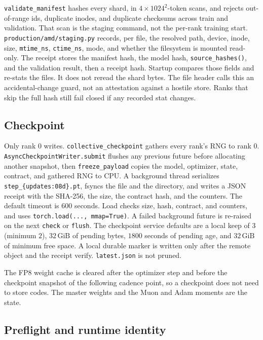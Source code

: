 \documentclass[11pt]{article}
\DeclareRobustCommand{\code}[1]{\texttt{#1}}
\newcommand{\GiB}{\,\mathrm{GiB}}
\begin{document}
\code{validate\_manifest} hashes every shard, in \(4\times 1024^{2}\)-token
scans, and rejects out-of-range ids, duplicate inodes, and duplicate
checksums across train and validation. That scan is the staging command, not
the per-rank training start. \code{production/amd/staging.py} records, per
file, the resolved path, device, inode, size, \code{mtime\_ns},
\code{ctime\_ns}, mode, and whether the filesystem is mounted read-only. The
receipt stores the manifest hash, the model hash, \code{source\_hashes()},
and the validation result, then a receipt hash. Startup compares those
fields and re-stats the files. It does not reread the shard bytes. The file
header calls this an accidental-change guard, not an attestation against a
hostile store. Ranks that skip the full hash still fail closed if any
recorded stat changes.

\subsection{Checkpoint}

Only rank \(0\) writes. \code{collective\_checkpoint} gathers every rank's
RNG to rank \(0\). \code{AsyncCheckpointWriter.submit} flushes any previous
future before allocating another snapshot, then \code{freeze\_payload} copies
the model, optimizer, state, contract, and gathered RNG to CPU. A background
thread serializes \code{step\_\{updates:08d\}.pt}, fsyncs the file and the
directory, and writes a JSON receipt with the SHA-256, the size, the
contract hash, and the counters. The default timeout is \(600\) seconds.
Load checks size, hash, contract, and counters, and uses
\code{torch.load(..., mmap=True)}. A failed background future is re-raised
on the next \code{check} or \code{flush}. The checkpoint service defaults are
a local keep of \(3\) (minimum \(2\)), \(32\GiB\) of pending bytes,
\(1800\) seconds of pending age, and \(32\GiB\) of minimum free space. A
local durable marker is written only after the remote object and the receipt
verify. \code{latest.json} is not pruned.

The FP8 weight cache is cleared after the optimizer step and before the
checkpoint snapshot of the following cadence point, so a checkpoint does not
need to store codes. The master weights and the Muon and Adam moments are
the state.

\subsection{Preflight and runtime identity}
\end{document}
